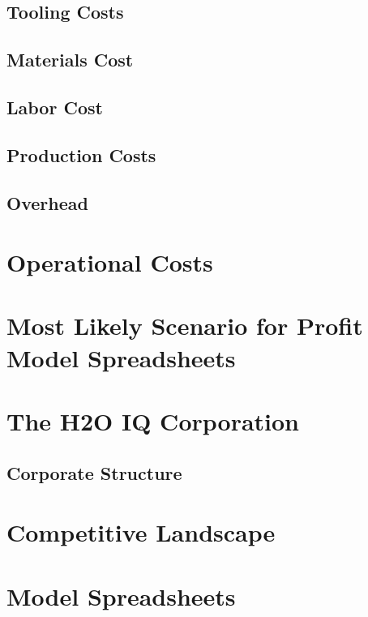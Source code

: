 \documentclass[11pt]{article}
\begin{document}
\subsection{Tooling Costs}
\subsection{Materials Cost}
\subsection{Labor Cost}
\subsection{Production Costs}
\subsection{Overhead}

\section{Operational Costs}

\section{Most Likely Scenario for Profit Model Spreadsheets}

\section{The H2O IQ Corporation}

\subsection{Corporate Structure}

\section{Competitive Landscape}

\section{Model Spreadsheets}




\end{document}
